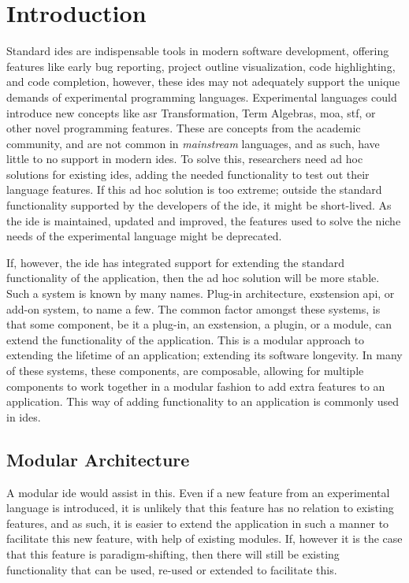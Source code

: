 \chapter{Introduction}

Standard \gls{ide}s are indispensable tools in modern software development,
offering features like early bug reporting, project outline visualization, code
highlighting, and code completion, however, these \gls{ide}s may not adequately
support the unique demands of experimental programming languages. Experimental
languages could introduce new concepts like \gls{asr} Transformation, Term
Algebras, \gls{moa}, \gls{stf}, or other novel programming features. These are
concepts from the academic community, and are not common in \textit{mainstream}
languages, and as such, have little to no support in modern \gls{ide}s. To solve
this, researchers need ad hoc solutions for existing \gls{ide}s, adding the
needed functionality to test out their language features. If this ad hoc
solution is too extreme; outside the standard functionality supported by the
developers of the \gls{ide}, it might be short-lived. As the \gls{ide} is
maintained, updated and improved, the features used to solve the niche needs of
the experimental language might be deprecated.

If, however, the \gls{ide} has integrated support for extending the standard
functionality of the application, then the ad hoc solution will be more stable.
Such a system is known by many names. Plug-in architecture, exstension
\gls{api}, or add-on system, to name a few. The common factor amongst these
systems, is that some component, be it a plug-in, an exstension, a plugin, or a
module, can extend the functionality of the application. This is a modular
approach to extending the lifetime of an application; extending its software
longevity. In many of these systems, these components, are composable,
allowing for multiple components to work together in a modular fashion to add
extra features to an application. This way of adding functionality to an
application is commonly used in \gls{ide}s.


\section{Modular Architecture}

A modular \gls{ide} would assist in this. Even if a new feature from an
experimental language is introduced, it is unlikely that this feature has no
relation to existing features, and as such, it is easier to extend the
application in such a manner to facilitate this new feature, with help of
existing modules. If, however it is the case that this feature is
paradigm-shifting, then there will still be existing functionality that can be
used, re-used or extended to facilitate this.

